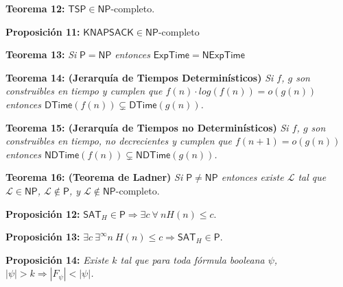 \documentclass{article}
\begin{document}
\begin{flushleft}
  \textbf{Teorema 12:}
  $\mathsf{TSP} \in \mathsf{NP}$-completo.
\end{flushleft}

\begin{flushleft}
  \textbf{Proposición 11:}
  $\mathsf{KNAPSACK} \in \mathsf{NP}$-completo
\end{flushleft}

\begin{flushleft}
  \textbf{Teorema 13:}
  \textit{Si} $\mathsf{P} = \mathsf{NP}$ \textit{entonces} $\mathsf{ExpTime} = \mathsf{NExpTime}$ 
\end{flushleft}

\begin{flushleft}
  \textbf{Teorema 14: \hypertarget{jerTdet}{\textcolor{Bittersweet}{(Jerarquía de Tiempos Determinísticos)}}}
  \textit{Si $f$, $g$ son construibles en tiempo y cumplen que $f(n) \cdot log(f(n)) = o(g(n))$ entonces $
  \mathsf{DTime}(f(n)) \subsetneq \mathsf{DTime}(g(n))$.} 
\end{flushleft}

\begin{flushleft}
  \textbf{Teorema 15: \hypertarget{jerTnodet}{\textcolor{Bittersweet}{(Jerarquía de Tiempos no Determinísticos)}}}
  \textit{Si $f$, $g$ son construibles en tiempo, no decrecientes y cumplen que $f(n + 1) = o(g(n))$ entonces 
  $\mathsf{NDTime}(f(n)) \subsetneq \mathsf{NDTime}(g(n))$.} 
\end{flushleft}

\begin{flushleft}
  \textbf{Teorema 16: \hypertarget{ladner}{\textcolor{Bittersweet}{(Teorema de Ladner)}}} 
  \textit{Si $\mathsf{P} \neq \mathsf{NP}$ entonces existe $\mathcal{L}$ tal que $\mathcal{L} \in \mathsf{NP}$,
  $\mathcal{L} \not\in \mathsf{P}$, y $\mathcal{L} \not\in \mathsf{NP}$}-completo. 
\end{flushleft}

\begin{flushleft}
  \textbf{Proposición 12:}
  $\mathsf{SAT}_H \in \mathsf{P} \Rightarrow \exists c \ \forall \ n H(n) \leq c$.
\end{flushleft}

\begin{flushleft}
  \textbf{Proposición 13:}
  $\exists c \ \exists^ {\infty} n \ H(n) \leq c \Rightarrow \mathsf{SAT}_H \in \mathsf{P}$.
\end{flushleft}

\begin{flushleft}
  \textbf{Proposición 14:}
  \textit{Existe $k$ tal que para toda fórmula booleana $\psi$, $|\psi| > k \Rightarrow |F_\psi| <
  |\psi|$.}
\end{flushleft}
\end{document}
